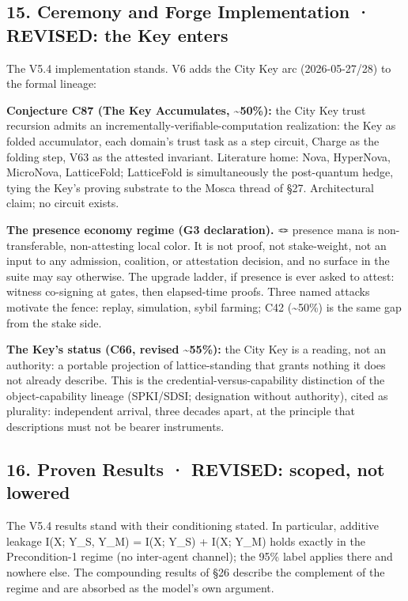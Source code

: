 \documentclass[
  11pt,
]{article}
\begin{document}
\subsection{15. Ceremony and Forge Implementation · REVISED: the Key
enters}\label{ceremony-and-forge-implementation-revised-the-key-enters}

The V5.4 implementation stands. V6 adds the City Key arc (2026-05-27/28)
to the formal lineage:

\textbf{Conjecture C87 (The Key Accumulates, \textasciitilde50\%):} the
City Key trust recursion admits an incrementally-verifiable-computation
realization: the Key as folded accumulator, each domain's trust task as
a step circuit, Charge as the folding step, V63 as the attested
invariant. Literature home: Nova, HyperNova, MicroNova, LatticeFold;
LatticeFold is simultaneously the post-quantum hedge, tying the Key's
proving substrate to the Mosca thread of §27. Architectural claim; no
circuit exists.

\textbf{The presence economy regime (G3 declaration).} 🪢 presence mana
is non-transferable, non-attesting local color. It is not proof, not
stake-weight, not an input to any admission, coalition, or attestation
decision, and no surface in the suite may say otherwise. The upgrade
ladder, if presence is ever asked to attest: witness co-signing at
gates, then elapsed-time proofs. Three named attacks motivate the fence:
replay, simulation, sybil farming; C42 (\textasciitilde50\%) is the same
gap from the stake side.

\textbf{The Key's status (C66, revised \textasciitilde55\%):} the City
Key is a reading, not an authority: a portable projection of
lattice-standing that grants nothing it does not already describe. This
is the credential-versus-capability distinction of the object-capability
lineage (SPKI/SDSI; designation without authority), cited as plurality:
independent arrival, three decades apart, at the principle that
descriptions must not be bearer instruments.

\subsection{16. Proven Results · REVISED: scoped, not
lowered}\label{proven-results-revised-scoped-not-lowered}

The V5.4 results stand with their conditioning stated. In particular,
additive leakage I(X; Y\_S, Y\_M) = I(X; Y\_S) + I(X; Y\_M) holds
exactly in the Precondition-1 regime (no inter-agent channel); the 95\%
label applies there and nowhere else. The compounding results of §26
describe the complement of the regime and are absorbed as the model's
own argument.
\end{document}
